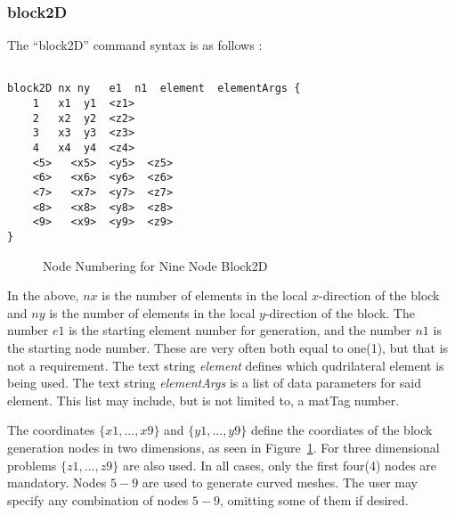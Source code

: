 \documentclass[12pt]{article}
\begin{document}
\subsubsection{block2D}
The ``block2D'' command syntax is as follows :
{\sf\small
\begin{verbatim}

block2D nx ny   e1  n1  element  elementArgs {
    1   x1  y1  <z1>
    2   x2  y2  <z2>
    3   x3  y3  <z3>
    4   x4  y4  <z4>
    <5>   <x5>  <y5>  <z5>
    <6>   <x6>  <y6>  <z6>
    <7>   <x7>  <y7>  <z7>
    <8>   <x8>  <y8>  <z8>
    <9>   <x9>  <y9>  <z9>
}
\end{verbatim}

\begin{figure}[htpb]
\begin{center}
\epsfysize=2.0in
\end{center}
\caption{Node Numbering for Nine Node Block2D}
\label{blocknodenumbering}
\end{figure}
}

In the above, $nx$ is the number of elements in the local $x$-direction of
the block and $ny$ is the number of elements in the local $y$-direction of
the block.  The number $e1$ is the starting element number for generation, and 
the number $n1$ is the starting node number.  These are very often both equal to 
one(1), but that is not a requirement.  The text string {\em element} defines 
which qudrilateral element is being used.  The text string {\em elementArgs}
is a list of data parameters for said element.  This list may include, but is
not limited to, a matTag number.

The coordinates $\{x1,...,x9\}$ and $\{y1,...,y9\}$ define the coordiates
of the block generation nodes in two dimensions, as seen in Figure~\ref{blocknodenumbering}.
For three dimensional 
problems $\{z1,...,z9\}$ are also used.  In all cases, only the first four(4) 
nodes are mandatory. Nodes $5-9$ are used to generate curved meshes.
The user may specify any combination of nodes $5-9$, omitting some of them
if desired.
\end{document}
